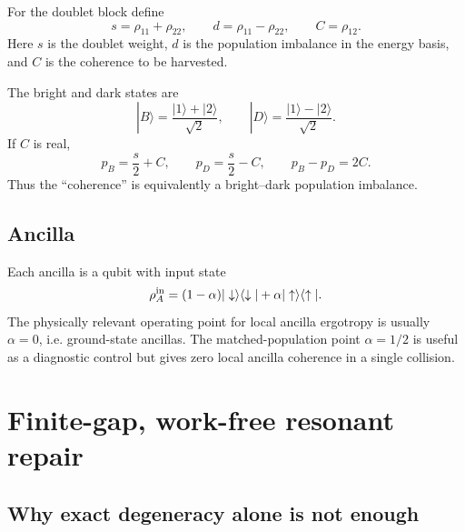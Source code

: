 \documentclass[11pt,a4paper]{article}
\newcommand{\ket}[1]{|#1\rangle}
\newcommand{\proj}[1]{|#1\rangle\langle #1|}
\begin{document}
For the doublet block define
\begin{equation}
 s=\rho_{11}+\rho_{22},\qquad d=\rho_{11}-\rho_{22},\qquad C=\rho_{12}.
\end{equation}
Here $s$ is the doublet weight, $d$ is the population imbalance in the energy basis, and $C$ is the coherence to be harvested.

The bright and dark states are
\begin{equation}
\ket{B}=\frac{\ket{1}+\ket{2}}{\sqrt2},\qquad
\ket{D}=\frac{\ket{1}-\ket{2}}{\sqrt2}.
\end{equation}
If $C$ is real,
\begin{equation}
 p_B=\frac{s}{2}+C,
 \qquad
 p_D=\frac{s}{2}-C,
 \qquad
 p_B-p_D=2C.
\end{equation}
Thus the ``coherence'' is equivalently a bright--dark population imbalance.

\subsection{Ancilla}

Each ancilla is a qubit with input state
\begin{equation}
\rho_A^{\rm in}=(1-\alpha)\proj{\downarrow}+\alpha\proj{\uparrow}.
\end{equation}
The physically relevant operating point for local ancilla ergotropy is usually $\alpha=0$, i.e. ground-state ancillas. The matched-population point $\alpha=1/2$ is useful as a diagnostic control but gives zero local ancilla coherence in a single collision.

\section{Finite-gap, work-free resonant repair}

\subsection{Why exact degeneracy alone is not enough}
\end{document}
